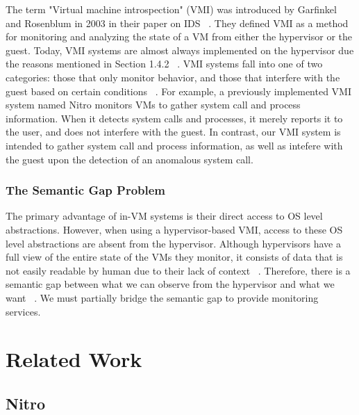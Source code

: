 \documentclass{report}
\begin{document}
\begin{spacing}{1.5}
{\large
The term "Virtual machine introspection" (VMI) was introduced by Garfinkel and Rosenblum in 2003 in their paper on IDS ~\cite{garfinkel2003virtual}. They defined VMI as a method for monitoring and analyzing the state of a VM from either the hypervisor or the guest. Today, VMI systems are almost always implemented on the hypervisor due the reasons mentioned in Section 1.4.2 ~\cite{bhatt2018using}. VMI systems fall into one of two categories: those that only monitor behavior, and those that interfere with the guest based on certain conditions ~\cite{nance2008virtual}. For example, a previously implemented VMI system named Nitro monitors VMs to gather system call and process information. When it detects system calls and processes, it merely reports it to the user, and does not interfere with the guest. In contrast, our VMI system is intended to gather system call and process information, as well as intefere with the guest upon the detection of an anomalous system call.
\newline
}


\subsection{The Semantic Gap Problem}

{\large
The primary advantage of in-VM systems is their direct access to OS level abstractions. However, when using a hypervisor-based VMI, access to these OS level abstractions are absent from the hypervisor. Although hypervisors have a full view of the entire state of the VMs they monitor, it consists of data that is not easily readable by human due to their lack of context ~\cite{bauman2015survey}. Therefore, there is a semantic gap between what we can observe from the hypervisor and what we want ~\cite{bauman2015survey}. We must partially bridge the semantic gap to provide monitoring services.
\newline
}


















\chapter{Related Work}


\section{Nitro}


\end{spacing}
\end{document}
